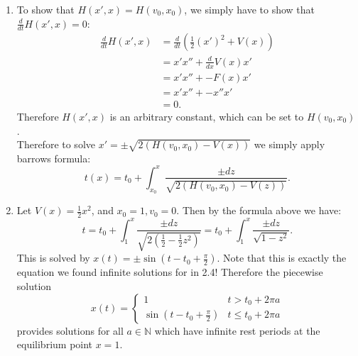 \documentclass[12pt, letterpaper]{article}
\newcommand{\N}{\mathbb{N}}
\begin{document}
\begin{enumerate}
\begin{enumerate}
			\item To show that $H(x',x) = H(v_0, x_0)$, we simply have to show that $\frac{d}{dt}H(x',x) = 0$:
			\begin{align*}
				\frac{d}{dt} H(x',x) &= \frac{d}{dt} (\frac{1}{2} (x')^2 + V(x))\\
				&= x' x'' + \frac{d}{dx}V(x) x'\\
				&= x' x'' + -F(x)x'\\
				&= x' x'' + -x'' x'\\
				&= 0.
			\end{align*}
			Therefore $H(x',x)$ is an arbitrary constant, which can be set to $H(v_0, x_0)$.\\
			Therefore to solve $x' = \pm \sqrt{2(H(v_0,x_0)-V(x))}$ we simply apply barrows formula:
			$$
				t(x) = t_0 + \int_{x_0}^x \frac{\pm dz}{\sqrt{2(H(v_0,x_0)-V(z))}}.
			$$
			\item Let $V(x) = \frac{1}{2} x^2$, and $x_0 = 1, v_0 = 0$.  Then by the formula above we have:
			$$
			t = t_0 + \int_1^x \frac{\pm dz}{\sqrt{2(\frac{1}{2}-\frac{1}{2} z^2)}} = t_0 + \int_1^x \frac{\pm dz}{\sqrt{1 - z^2}}.		
			$$
			This is solved by $x(t) = \pm \sin(t-t_0+\frac{\pi}{2})$.
			Note that this is exactly the equation we found infinite solutions for in 2.4!  Therefore the piecewise solution 
			\[
			x(t) = \begin{cases}
				1 & t > t_0  + 2 \pi a \\
				\sin(t - t_0 + \frac{\pi}{2}) & t \leq 	t_0 + 2 \pi a
			\end{cases}
		\]
			provides solutions for all $a \in \N$ which have infinite rest periods at the equilibrium point $x=1$.  
		\end{enumerate}

\end{enumerate}
\end{document}
